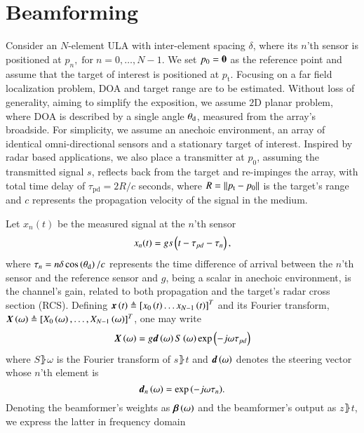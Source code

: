 \section{Beamforming}\label{sec:setup}
Consider an $N$-element ULA with inter-element spacing $\delta$, where its $n$'th sensor is positioned at $p_{n},\;\text{for}\; n=0,\ldots,N-1$. We set $p_{0}=\boldsymbol{0}$ as the reference point and assume that the target of interest is positioned at $p_{\text{t}}$.
Focusing on a far field localization problem, DOA and target range are to be estimated. Without loss of generality, aiming to simplify the exposition, we assume $2\text{D}$ planar problem, where DOA is described by a single angle $\theta_{\text{d}}$, measured from the array's broadside.
For simplicity, we assume an anechoic environment, an array of identical omni-directional sensors and a stationary target of interest.
Inspired by radar based applications, we also place a transmitter at $p_{0}$, assuming the transmitted signal $s$, reflects back from the target and re-impinges the array, with total time delay of $\tau_{\text{pd}}=2R/c$ seconds, where $R = \left\Vert p_{\text{t}}-p_{0}\right\Vert$ is the target's range and $c$ represents the propagation velocity of the signal in the medium. 
\par Let $x_{n}(t)$ be the measured signal at the $n$'th sensor
\begin{equation}
x_{n}(t) = gs\Brack{t-\tau_{pd}-\tau_{n}},
\label{eqn:noFeedbackULA_singleSensor_temporal}
\end{equation}
where $\tau_{n}=n\delta\cos\left({\theta_{\text{d}}}\right)/c$ represents the time difference of arrival between the $n$'th sensor and the reference sensor and $g$, being a scalar in anechoic environment, is the channel's gain, related to both propagation and the target's radar cross section (RCS).
Defining $\boldsymbol{x}\left({t}\right)\triangleq\left[{x_{0}\left({t}\right)\hdots{}x_{N-1}\left({t}\right)}\right]^{T}$ and its Fourier transform, $\vecnot{\F{x}}\rBrace{\omega}\triangleq\vBrace{X_{0}\rBrace{\omega},\hdots,X_{N-1}\rBrace{\omega}}^{T}$, one may write 
\[
\vecnot{\F{x}}\rBrace{\omega}=g\vecnot{d}\rBrace{\omega}\F{s}\rBrace{\omega}\exp{\rBrace{-j\omega\tau_{pd}}}
\]
where $S\rBrace{\omega}$ is the Fourier transform of $s\rBrace{t}$ and $\boldsymbol{d}\left({\omega}\right)$ denotes the steering vector whose $n$'th element is
\begin{equation}
    \label{eq:d}
    \vecnot{d}_{n}\rBrace{\omega} = \exp{\rBrace{-j\omega\tau_{n}}}.
\end{equation}
Denoting the beamformer's weights as $\vBeta\rBrace{\omega}$ and the beamformer's output as $z\rBrace{t}$, we express the latter in frequency domain
